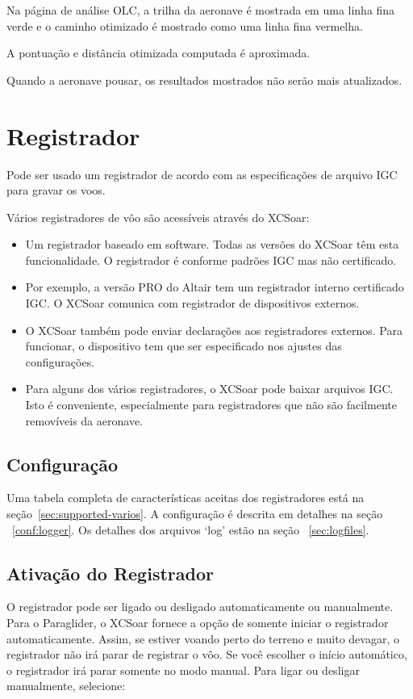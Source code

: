 Na página de análise OLC, a trilha da aeronave é mostrada em uma linha fina verde e o caminho otimizado é mostrado como uma linha fina vermelha.

A pontuação e distância otimizada computada é aproximada.

Quando a aeronave pousar, os resultados mostrados não serão mais atualizados.



\section{Registrador}\label{sec:logger}

Pode ser usado um registrador de acordo com as especificações de arquivo IGC para gravar os voos.

Vários registradores de vôo são acessíveis através do XCSoar:

\begin{itemize}
\item Um registrador baseado em software.  Todas as versões do XCSoar têm esta funcionalidade.  O registrador é conforme padrões IGC mas não certificado. 
\item Por exemplo, a versão PRO do Altair tem um registrador interno certificado IGC.  O XCSoar comunica com registrador de dispositivos externos.
\item O XCSoar também pode enviar declarações aos registradores externos.  Para funcionar, o dispositivo tem que ser especificado nos ajustes das configurações.
\item  Para alguns dos vários registradores, o XCSoar pode baixar arquivos IGC.  Isto é conveniente, especialmente para registradores que não são facilmente removíveis da aeronave.  
\end{itemize}

\subsection*{Configuração}
Uma tabela completa de características aceitas dos registradores está na seção~\ref{sec:supported-varios}.  
A configuração é descrita em detalhes na seção ~\ref{conf:logger}.  Os detalhes dos arquivos ‘log’ estão na seção ~\ref{sec:logfiles}.

\subsection*{Ativação do Registrador}
O registrador pode ser ligado ou desligado automaticamente ou manualmente.  Para o Paraglider, o XCSoar fornece a opção de somente iniciar o registrador automaticamente. Assim, se estiver voando perto do terreno e muito devagar, o registrador não irá parar de registrar o vôo.  Se você escolher o início automático, o registrador irá parar somente no modo manual.  Para ligar ou desligar manualmente, selecione:
\begin{quote}
\blink{}
\end{quote}

